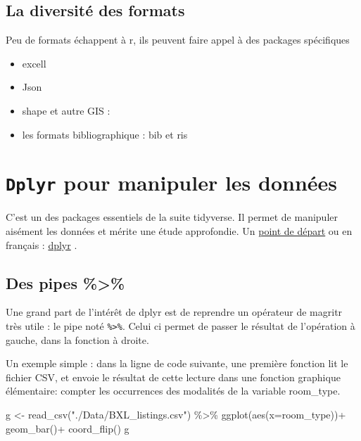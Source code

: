 \documentclass[
]{book}
\newenvironment{Shaded}{\begin{snugshade}}{\end{snugshade}}
\newcommand{\AttributeTok}[1]{\textcolor[rgb]{0.77,0.63,0.00}{#1}}
\newcommand{\FunctionTok}[1]{\textcolor[rgb]{0.00,0.00,0.00}{#1}}
\newcommand{\NormalTok}[1]{#1}
\newcommand{\OtherTok}[1]{\textcolor[rgb]{0.56,0.35,0.01}{#1}}
\newcommand{\SpecialCharTok}[1]{\textcolor[rgb]{0.00,0.00,0.00}{#1}}
\newcommand{\StringTok}[1]{\textcolor[rgb]{0.31,0.60,0.02}{#1}}
\providecommand{\tightlist}{%
  \setlength{\itemsep}{0pt}\setlength{\parskip}{0pt}}
\begin{document}
\hypertarget{la-diversituxe9-des-formats}{%
\subsection{La diversité des formats}\label{la-diversituxe9-des-formats}}

Peu de formats échappent à r, ils peuvent faire appel à des packages spécifiques

\begin{itemize}
\tightlist
\item
  excell
\item
  Json
\item
  shape et autre GIS :
\item
  les formats bibliographique : bib et ris
\end{itemize}

\hypertarget{dplyr-pour-manipuler-les-donnuxe9es}{%
\section{\texorpdfstring{\texttt{Dplyr} pour manipuler les données}{Dplyr pour manipuler les données}}\label{dplyr-pour-manipuler-les-donnuxe9es}}

C'est un des packages essentiels de la suite tidyverse. Il permet de manipuler aisément les données et mérite une étude approfondie. Un \href{https://dplyr.tidyverse.org/articles/dplyr.html}{point de départ} ou en français : \href{http://larmarange.github.io/analyse-R/manipuler-les-donnees-avec-dplyr.html}{dplyr} .

\hypertarget{des-pipes}{%
\subsection{Des pipes \%\textgreater\%}\label{des-pipes}}

Une grand part de l'intérêt de dplyr est de reprendre un opérateur de magritr très utile : le pipe noté \texttt{\%\textgreater{}\%}. Celui ci permet de passer le résultat de l'opération à gauche, dans la fonction à droite.

Un exemple simple : dans la ligne de code suivante, une première fonction lit le fichier CSV, et envoie le résultat de cette lecture dans une fonction graphique élémentaire: compter les occurrences des modalités de la variable room\_type.

\begin{Shaded}
\begin{Highlighting}[]
\NormalTok{g }\OtherTok{\textless{}{-}} \FunctionTok{read\_csv}\NormalTok{(}\StringTok{"./Data/BXL\_listings.csv"}\NormalTok{) }\SpecialCharTok{\%\textgreater{}\%} 
  \FunctionTok{ggplot}\NormalTok{(}\FunctionTok{aes}\NormalTok{(}\AttributeTok{x=}\NormalTok{room\_type))}\SpecialCharTok{+}
  \FunctionTok{geom\_bar}\NormalTok{()}\SpecialCharTok{+}
  \FunctionTok{coord\_flip}\NormalTok{()}
\NormalTok{g}
\end{Highlighting}
\end{Shaded}
\end{document}
